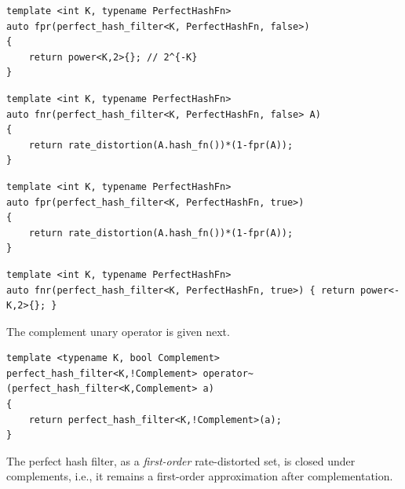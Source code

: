 \documentclass[ ../main.tex]{subfiles}
\begin{document}
\begin{verbatim}
template <int K, typename PerfectHashFn>
auto fpr(perfect_hash_filter<K, PerfectHashFn, false>)
{
	return power<K,2>{}; // 2^{-K}
}
\end{verbatim}

\begin{verbatim}
template <int K, typename PerfectHashFn>
auto fnr(perfect_hash_filter<K, PerfectHashFn, false> A)
{
	return rate_distortion(A.hash_fn())*(1-fpr(A));
}
\end{verbatim}

\begin{verbatim}
template <int K, typename PerfectHashFn>
auto fpr(perfect_hash_filter<K, PerfectHashFn, true>)
{
	return rate_distortion(A.hash_fn())*(1-fpr(A));
}
\end{verbatim}

\begin{verbatim}
template <int K, typename PerfectHashFn>
auto fnr(perfect_hash_filter<K, PerfectHashFn, true>) { return power<-K,2>{}; }
\end{verbatim}

The complement unary operator is given next.
\begin{verbatim}
template <typename K, bool Complement>
perfect_hash_filter<K,!Complement> operator~(perfect_hash_filter<K,Complement> a)
{
	return perfect_hash_filter<K,!Complement>(a);
}
\end{verbatim}

The perfect hash filter, as a \emph{first-order} rate-distorted set, is closed under complements, i.e., it remains a first-order approximation after complementation.
\end{document}
